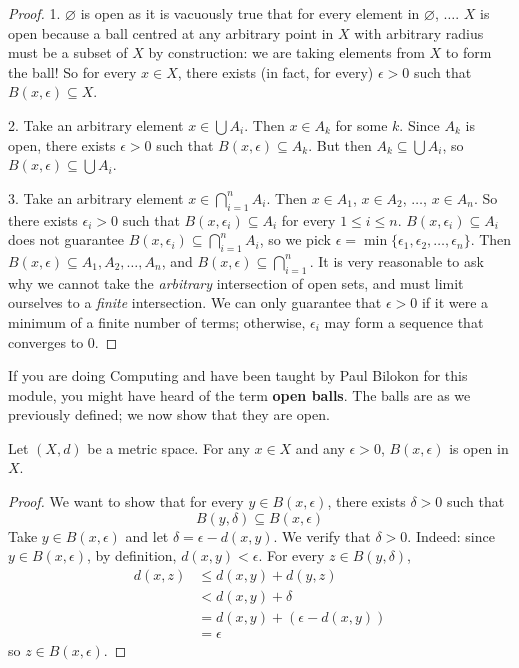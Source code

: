 \begin{proof}
  1. $\varnothing$ is open as it is vacuously true that for every element in $\varnothing$, $\ldots$. $X$ is open because a ball centred at any arbitrary point in $X$ with arbitrary radius must be a subset of $X$ by construction: we are taking elements from $X$ to form the ball! So for every $x \in X$, there exists (in fact, for every) $\epsilon > 0$ such that $B(x, \epsilon) \subseteq X$.

  2. Take an arbitrary element $x \in \bigcup A_i$. Then $x \in A_k$ for some $k$. Since $A_k$ is open, there exists $\epsilon > 0$ such that $B(x, \epsilon) \subseteq A_k$. But then $A_k \subseteq \bigcup A_i$, so $B(x, \epsilon) \subseteq \bigcup A_i$.

  3. Take an arbitrary element $x \in \bigcap_{i = 1}^{n} A_i$. Then $x \in A_1$, $x \in A_2$, $\ldots$, $x \in A_n$. So there exists $\epsilon_i > 0$ such that $B(x, \epsilon_i) \subseteq A_i$ for every $1 \leq i \leq n$. $B(x, \epsilon_i) \subseteq A_i$ does not guarantee $B(x, \epsilon_i) \subseteq \bigcap_{i = 1}^{n} A_i$, so we pick $\epsilon = \min\{\epsilon_1, \epsilon_2, \ldots, \epsilon_n\}$. Then $B(x, \epsilon) \subseteq A_1, A_2, \ldots, A_n$, and $B(x, \epsilon) \subseteq \bigcap_{i = 1}^{n}$. It is very reasonable to ask why we cannot take the \textit{arbitrary} intersection of open sets, and must limit ourselves to a \textit{finite} intersection. We can only guarantee that $\epsilon > 0$ if it were a minimum of a finite number of terms; otherwise, $\epsilon_i$ may form a sequence that converges to 0.
\end{proof}
If you are doing Computing and have been taught by Paul Bilokon for this module, you might have heard of the term \textbf{open balls}. The balls are as we previously defined; we now show that they are open.
\begin{prop}
  Let $(X, d)$ be a metric space. For any $x \in X$ and any $\epsilon > 0$, $B(x, \epsilon)$ is open in $X$.
\end{prop}
\begin{proof}
  We want to show that for every $y \in B(x, \epsilon)$, there exists $\delta > 0$ such that
  \[
    B(y, \delta) \subseteq B(x, \epsilon)
  \]
  Take $y \in B(x, \epsilon)$ and let $\delta = \epsilon - d(x, y)$. We verify that $\delta > 0$. Indeed: since $y \in B(x, \epsilon)$, by definition, $d(x, y) < \epsilon$. For every $z \in B(y, \delta)$,
  \begin{align*}
    d(x, z) &\leq d(x, y) + d(y, z) \\ 
    &< d(x, y) + \delta \\ 
    &= d(x, y) + (\epsilon - d(x, y)) \\ 
    &= \epsilon
  \end{align*}
  so $z \in B(x, \epsilon)$.
\end{proof}
